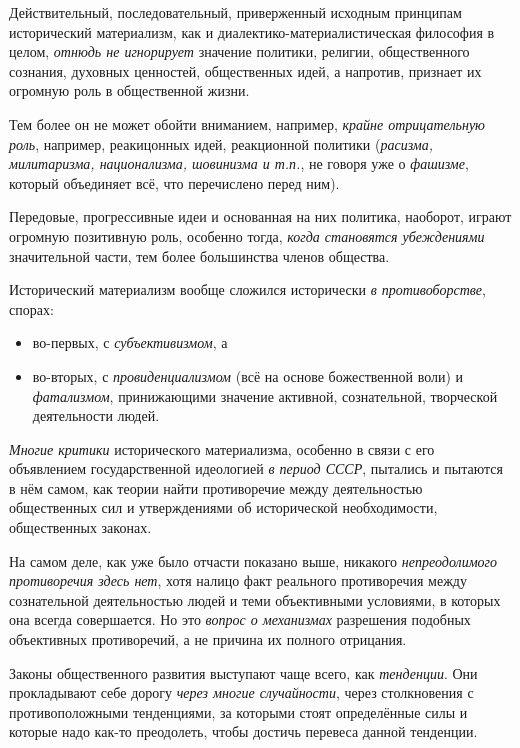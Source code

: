 \documentclass[a4paper,14pt,russian]{extreport}
\begin{document}
Действительный, последовательный, приверженный исходным принципам исторический материализм, как и диалектико-материалистическая философия в целом, \emph{отнюдь не игнорирует} значение политики, религии, общественного сознания, духовных ценностей, общественных идей, а напротив, признает их огромную роль в общественной жизни.

Тем более он не может обойти вниманием, например, \emph{крайне отрицательную роль}, например, реакицонных идей, реакционной политики (\emph{расизма, милитаризма, национализма, шовинизма и т.п.}, не говоря уже о \emph{фашизме}, который объединяет всё, что перечислено перед ним).

Передовые, прогрессивные идеи и основанная на них политика, наоборот, играют огромную позитивную роль, особенно тогда, \emph{когда становятся убеждениями} значительной части, тем более большинства членов общества.

Исторический материализм вообще сложился исторически \emph{в противоборстве}, спорах:

\begin{itemize}
\item во-первых, с \emph{субъективизмом}, а
\item во-вторых, с \emph{провиденциализмом} (всё на основе божественной воли) и \emph{фатализмом}, принижающими значение активной, сознательной, творческой деятельности людей.
\end{itemize}

\emph{Многие критики} исторического материализма, особенно в связи с его объявлением государственной идеологией \emph{в период СССР}, пытались и пытаются в нём самом, как теории найти противоречие между деятельностью общественных сил и утверждениями об исторической необходимости, общественных законах.

На самом деле, как уже было отчасти показано выше, никакого \emph{непреодолимого противоречия здесь нет}, хотя налицо факт реального противоречия между сознательной деятельностью людей и теми объективными условиями, в которых она всегда совершается. Но это \emph{вопрос о механизмах} разрешения подобных объективных противоречий, а не причина их полного отрицания.

Законы общественного развития выступают чаще всего, как \emph{тенденции}. Они прокладывают себе дорогу \emph{через многие случайности}, через столкновения с противоположными тенденциями, за которыми стоят определённые силы и которые надо как-то преодолеть, чтобы достичь перевеса данной тенденции.
\end{document}
